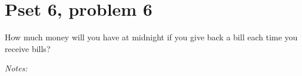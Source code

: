 \documentclass[justified]{tufte-handout}
\begin{document}
\section{Pset 6, problem 6}

\noindent How much money will you have at midnight if you give back a bill each time you receive bills?

\noindent \emph{Notes:}  \underline{\hspace{15.4cm}}\\\\\underline{\hspace{16.43cm}}\\\\\underline{\hspace{16.43cm}}\\\\\underline{\hspace{16.43cm}}\\\\\underline{\hspace{16.43cm}}\\
\end{document}
